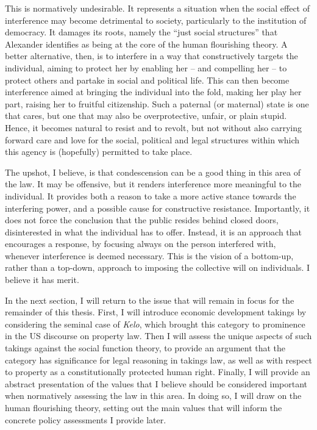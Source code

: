 This is normatively undesirable. It represents a situation when the social effect of interference may become detrimental to society, particularly to the institution of democracy. It damages its roots, namely the ``just social structures'' that Alexander identifies as being at the core of the human flourishing theory. A better alternative, then, is to interfere in a way that constructively targets the individual, aiming to protect her by enabling her -- and compelling her -- to protect others and partake in social and political life. This can then become interference aimed at bringing the individual into the fold, making her play her part, raising her to fruitful citizenship. Such a paternal (or maternal) state is one that cares, but one that may also be overprotective, unfair, or plain stupid. Hence, it becomes natural to resist and to revolt, but not without also carrying forward care and love for the social, political and legal structures within which this agency is (hopefully) permitted to take place.

The upshot, I believe, is that condescension can be a good thing in this area of the law. It may be offensive, but it renders interference more meaningful to the individual. It provides both a reason to take a more active stance towards the interfering power, and a possible cause for constructive resistance. Importantly, it does not force the conclusion that the public resides behind closed doors, disinterested in what the individual has to offer. Instead, it is an approach that encourages a response, by focusing always on the person interfered with, whenever interference is deemed necessary. This is the vision of a bottom-up, rather than a top-down, approach to imposing the collective will on individuals. I believe it has merit.

In the next section, I will return to the issue that will remain in focus for the remainder of this thesis. First, I will introduce economic development takings by considering the seminal case of {\it Kelo}, which brought this category to prominence in the US discourse on property law. Then I will assess the unique aspects of such takings against the social function theory, to provide an argument that the category has significance for legal reasoning in takings law, as well as with respect to property as a constitutionally protected human right. Finally, I will provide an abstract presentation of the values that I believe should be considered important when normatively assessing the law in this area. In doing so, I will draw on the human flourishing theory, setting out the main values that will inform the concrete policy assessments I provide later. 

